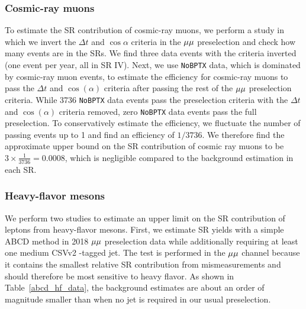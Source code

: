 

\subsubsection{Cosmic-ray muons}
To estimate the SR contribution of cosmic-ray muons, we perform a study in which we invert the $\Delta t$ and $\cos{\alpha}$ criteria in the ${\mu}{\mu}$ preselection and check how many events are in the SRs. We find three data events with the criteria inverted (one event per year, all in SR IV). Next, we use \texttt{NoBPTX} data, which is dominated by cosmic-ray muon events, to estimate the efficiency for cosmic-ray muons to pass the $\Delta t$ and $\cos{(\alpha)}$ criteria after passing the rest of the ${\mu}{\mu}$ preselection criteria. While \num{3736} \texttt{NoBPTX} data events pass the preselection criteria with the $\Delta t$ and $\cos{(\alpha)}$ criteria removed, zero \texttt{NoBPTX} data events pass the full preselection. To conservatively estimate the efficiency, we fluctuate the number of passing events up to 1 and find an efficiency of $1/3736$. We therefore find the approximate upper bound on the SR contribution of cosmic ray muons to be $3\times\frac{1}{3736}=0.0008$, which is negligible compared to the background estimation in each SR.

\subsubsection{Heavy-flavor mesons}
We perform two studies to estimate an upper limit on the SR contribution of leptons from heavy-flavor mesons. First, we estimate SR yields with a simple ABCD method in 2018 ${\mu}{\mu}$ preselection data while additionally requiring at least one medium CSVv2 \PQb-tagged jet. The test is performed in the ${\mu}{\mu}$ channel because it contains the smallest relative SR contribution from mismeasurements and should therefore be most sensitive to heavy flavor. As shown in Table~\ref{abcd_hf_data}, the background estimates are about an order of magnitude smaller than when no \PQb jet is required in our usual preselection.



